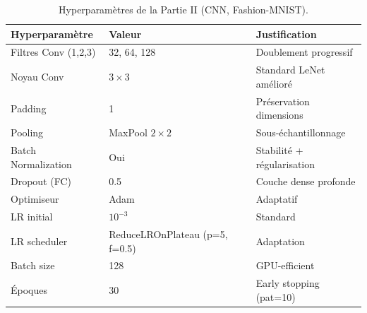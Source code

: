 \documentclass[11pt,a4paper]{article}
\begin{document}
\begin{table}[H]
  \centering
  \caption{Hyperparamètres de la Partie II (CNN, Fashion-MNIST).}
  \label{tab:hp_cnn}
  \begin{tabular}{lll}
    \toprule
    \textbf{Hyperparamètre} & \textbf{Valeur} & \textbf{Justification} \\
    \midrule
    Filtres Conv (1,2,3)    & 32, 64, 128     & Doublement progressif    \\
    Noyau Conv              & $3\times3$      & Standard LeNet amélioré  \\
    Padding                 & 1               & Préservation dimensions  \\
    Pooling                 & MaxPool $2\times2$ & Sous-échantillonnage   \\
    Batch Normalization     & Oui             & Stabilité + régularisation \\
    Dropout (FC)            & 0.5             & Couche dense profonde    \\
    Optimiseur              & Adam            & Adaptatif               \\
    LR initial              & $10^{-3}$       & Standard                \\
    LR scheduler            & ReduceLROnPlateau (p=5, f=0.5) & Adaptation \\
    Batch size              & 128             & GPU-efficient            \\
    Époques                 & 30              & Early stopping (pat=10)  \\
    \bottomrule
  \end{tabular}
\end{table}
\end{document}
